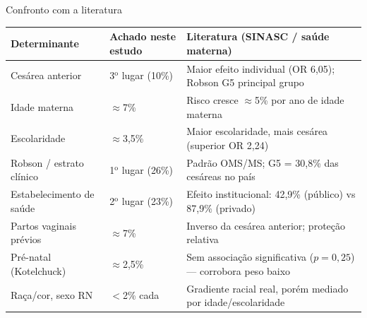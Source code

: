 \documentclass[aspectratio=169,xcolor=table]{beamer}
\begin{document}
\begin{frame}{Confronto com a literatura}
    \scriptsize
    \begin{table}
        \centering
        \begin{tabular}{p{3.2cm}p{3.8cm}p{5.8cm}}
            \toprule
            Determinante & Achado neste estudo & Literatura (SINASC / saúde materna) \\
            \midrule
            Cesárea anterior &
            3$^\mathrm{o}$ lugar (10\%) &
            Maior efeito individual (OR 6,05); Robson G5 principal grupo \cite{shrivastava2025, knobel2020} \\
            Idade materna &
            $\approx$7\% &
            Risco cresce $\approx$5\% por ano de idade materna \cite{shrivastava2025} \\
            Escolaridade &
            $\approx$3{,}5\% &
            Maior escolaridade, mais cesárea (superior OR 2,24) \cite{shrivastava2025} \\
            Robson / estrato clínico &
            1$^\mathrm{o}$ lugar (26\%) &
            Padrão OMS/MS; G5 = 30,8\% das cesáreas no país \cite{rocha2023, knobel2020} \\
            Estabelecimento de saúde &
            2$^\mathrm{o}$ lugar (23\%) &
            Efeito institucional: 42,9\% (público) vs 87,9\% (privado) \cite{nakamura2016} \\
            Partos vaginais prévios &
            $\approx$7\% &
            Inverso da cesárea anterior; proteção relativa \cite{shrivastava2025} \\
            Pré-natal (Kotelchuck) &
            $\approx$2{,}5\% &
            Sem associação significativa ($p=0{,}25$) — corrobora peso baixo \cite{piva2023} \\
            Raça/cor, sexo RN &
            $<$2\% cada &
            Gradiente racial real, porém mediado por idade/escolaridade \cite{shrivastava2025} \\
            \bottomrule
        \end{tabular}
    \end{table}
\end{frame}
\end{document}
